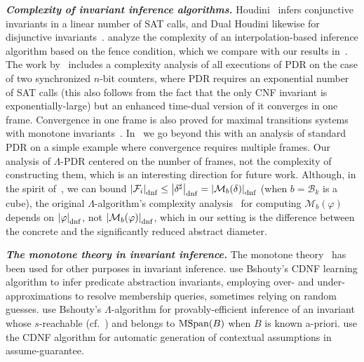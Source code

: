 \documentclass[acmsmall,screen]{acmart}
\newcommand{\para}[1]{\vspace{2pt}\noindent\textbf{\textit{#1.}}}
\newcommand{\card}[1]{{\left\vert{#1}\right\vert}} %
\newcommand{\tr}{\delta}
\newcommand{\Frame}{\mathcal{F}}
\newcommand{\bkwrch}[1]{\mathcal{B}_{#1}}
\newcommand{\dnfsize}[1]{\card{#1}_{\rm dnf}}
\newcommand{\monox}[2]{\mathcal{M}_{#2}({#1})}
\newcommand{\mspan}[1]{{\rm MSpan}({#1})}
\newcommand{\abs}[1]{{#1}^{\sharp}}
\newcommand{\bkcube}{b}
\begin{document}
\para{Complexity of invariant inference algorithms}
%
Houdini~\cite{DBLP:conf/fm/FlanaganL01} infers conjunctive invariants in a linear number of SAT calls, and Dual Houdini likewise for disjunctive invariants~\cite{DBLP:conf/cade/LahiriQ09}.
\citet{DBLP:journals/pacmpl/FeldmanSSW21} analyze the complexity of an interpolation-based inference algorithm based on the fence condition, which we compare with our results in~.
The work by~\citet{DBLP:conf/mbmv/SeufertS17} includes a complexity analysis of all executions of PDR on the case of two synchronized $n$-bit counters, where PDR requires an exponential number of SAT calls (this also follows from the fact that the only CNF invariant is exponentially-large) but an enhanced time-dual version of it converges in one frame.
Convergence in one frame is also proved for maximal transitions systems with monotone invariants~\cite{DBLP:journals/pacmpl/FeldmanISS20}.
In~
we go beyond this with an analysis of standard PDR on a simple example where convergence requires multiple frames.
Our analysis of $\Lambda$-PDR centered on the number of frames, not the complexity of constructing them, which is an interesting direction for future work.
Although, in the spirit of~, we can bound $\dnfsize{\Frame_i} \leq \dnfsize{\abs{\tr}} = \dnfsize{\monox{\tr}{\bkcube}}$ (when $\bkcube=\bkwrch{k}$ is a cube), the original $\Lambda$-algorithm's complexity analysis~\cite{DBLP:journals/iandc/Bshouty95} for computing $\monox{\varphi}{\bkcube}$ depends on $\dnfsize{\varphi}$, not $\dnfsize{\monox{\varphi}{\bkcube}}$, which in our setting is the difference between the concrete and the significantly reduced abstract diameter.
%
%

\para{The monotone theory in invariant inference}
The monotone theory~\cite{DBLP:journals/iandc/Bshouty95} has been used for other purposes in invariant inference.
\citet{DBLP:journals/mscs/JungKDWY15} use Bshouty's CDNF learning algorithm to infer predicate abstraction invariants, employing over- and under-approximations to resolve membership queries, sometimes relying on random guesses.
\citet{DBLP:journals/pacmpl/FeldmanSSW21} use Bshouty's $\Lambda$-algorithm for provably-efficient inference of an invariant whose $s$-reachable (cf.~) and belongs to $\mspan{B}$ when $B$ is known a-priori.
\citet{DBLP:conf/cav/ChenCFTTW10} use the CDNF algorithm for automatic generation of contextual assumptions in assume-guarantee.%
 
\end{document}
